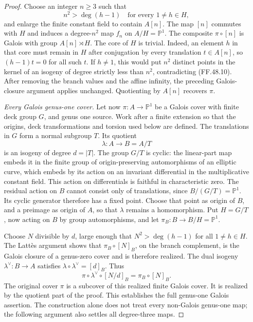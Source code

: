 \begin{proof}
Choose an integer \(n\ge3\) such that
\[
                 n^2>\deg(h-1)
                  \quad\text{for every }1\ne h\in H,
                                                        \tag{FF.48.10}
\]
and enlarge the finite constant field to contain
\(A[n]\). The map \([n]\) commutes with \(H\)
and induces a degree-\(n^2\) map \(f_n\) on
\(A/H=\mathbb P^1\). The composite
\(\pi\circ[n]\) is Galois with group
\(A[n]\rtimes H\). The core of \(H\) is trivial.
Indeed, an element \(h\) in that core must remain
in \(H\) after conjugation by every translation
\(t\in A[n]\), so \((h-1)t=0\) for all such
\(t\). If \(h\ne1\), this would put \(n^2\)
distinct points in the kernel of an isogeny of degree
strictly less than \(n^2\), contradicting (FF.48.10).
After removing the branch values and the affine
infinity, the preceding Galois-closure argument applies
unchanged. Quotienting by \(A[n]\) recovers
\(\pi\).

\emph{Every Galois genus-one cover.}
Let now \(\pi:A\to\mathbb P^1\) be a Galois
cover with finite deck group \(G\), and genus one
source. Work after a finite extension so that the
origins, deck transformations and torsion used below
are defined. The translations in \(G\) form a normal
subgroup \(T\). Its quotient
\[
                  \lambda:A\longrightarrow B=A/T
\]
is an isogeny of degree \(d=|T|\). The group
\(G/T\) is cyclic: the linear-part map embeds it in
the finite group of origin-preserving automorphisms
of an elliptic curve, which embeds by its action on
an invariant differential in the multiplicative
constant field. This action on differentials is
faithful in characteristic zero. The residual action
on \(B\) cannot consist only of translations,
since \(B/(G/T)=\mathbb P^1\). Its cyclic generator
therefore has a fixed point. Choose that point as
origin of \(B\), and a preimage as origin of \(A\),
so that \(\lambda\) remains a homomorphism. Put
\(H=G/T\), now acting on \(B\) by group
automorphisms, and let
\(\pi_B:B\to B/H=\mathbb P^1\).

Choose \(N\) divisible by \(d\), large enough
that \(N^2>\deg(h-1)\) for all \(1\ne h\in H\).
The Latt\`es argument shows that
\(\pi_B\circ[N]_B\), on the branch complement,
is the Galois closure of a genus-zero cover and is
therefore realized. The dual isogeny
\(\lambda^\vee:B\to A\) satisfies
\(\lambda\circ\lambda^\vee=[d]_B\). Thus
\[
 \pi\circ\lambda^\vee\circ[N/d]_B
                       =\pi_B\circ[N]_B.
                                                        \tag{FF.48.11}
\]
The original cover \(\pi\) is a subcover of this
realized finite Galois cover. It is realized by the
quotient part of the proof. This establishes the
full genus-one Galois assertion. The construction alone
does not treat every non-Galois genus-one map; the
following argument also settles all degree-three maps.


\end{proof}
